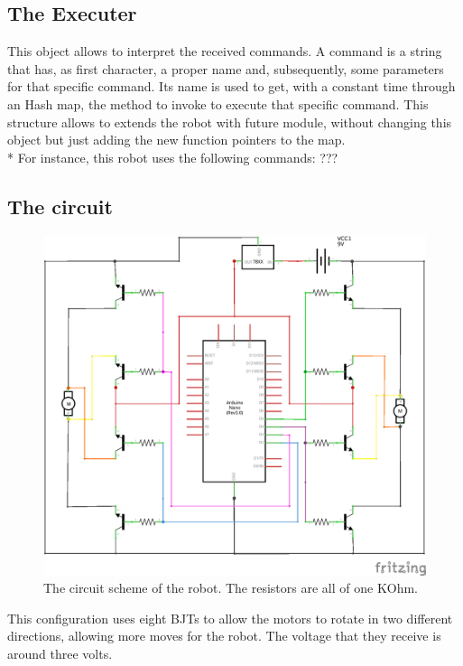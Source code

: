 \subsection{The Executer}
This object allows to interpret the received commands. A command is a string that has, as first character, a proper name and, subsequently, some parameters for that specific command. Its name is used to get, with a constant time through an Hash map, the method to invoke to execute that specific command. This structure allows to extends the robot with future module, without changing this object but just adding the new function pointers to the map.\\*
For instance, this robot uses the following commands:
???
\newpage

\subsection{The circuit}
\begin{figure}[h!]
	\centering
	\hspace*{-0.05 \textwidth}\includegraphics[width= 1.1\textwidth]
	{files/images/ReceiverScheme}
	\caption{The circuit scheme of the robot. The resistors are all of one KOhm.}
\end{figure}
This configuration uses eight BJTs to allow the motors to rotate in two different directions, allowing more moves for the robot. The voltage that they receive is around three volts.